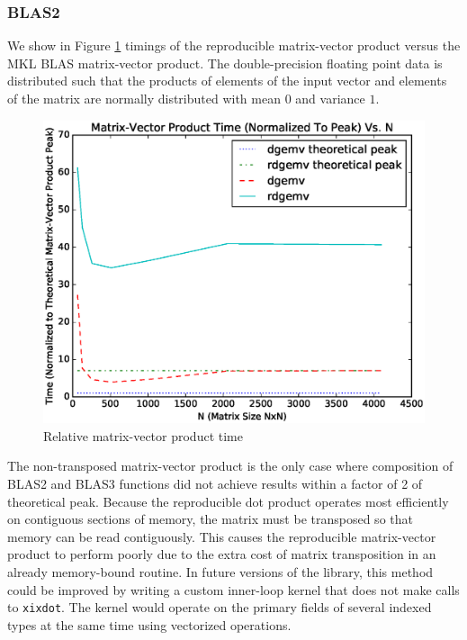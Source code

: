   \subsubsection{BLAS2}
    We show in Figure \ref{fig:gemv_timings} timings of the reproducible matrix-vector product versus the MKL BLAS matrix-vector product. The double-precision floating point data is distributed such that the products of elements of the input vector and elements of the matrix are normally distributed with mean $0$ and variance $1$.
  \begin{figure}[H]
  \begin{center}
  \includegraphics[width=\textwidth]{plots/gemv_comparison}
  \caption{Relative matrix-vector product time}
  \label{fig:gemv_timings}
  \end{center}
  \end{figure}
  The non-transposed matrix-vector product is the only case where composition of BLAS2 and BLAS3 functions did not achieve results within a factor of 2 of theoretical peak. Because the reproducible dot product operates most efficiently on contiguous sections of memory, the matrix must be transposed so that memory can be read contiguously. This causes the reproducible matrix-vector product to perform poorly due to the extra cost of matrix transposition in an already memory-bound routine. In future versions of the library, this method could be improved by writing a custom inner-loop kernel that does not make calls to \texttt{xixdot}. The kernel would operate on the primary fields of several indexed types at the same time using vectorized operations.

